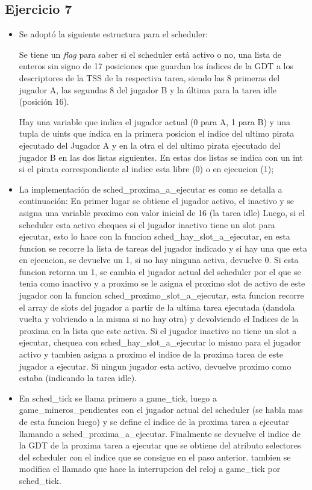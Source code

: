 \subsection{Ejercicio 7}

\begin{itemize}

\item Se adoptó la siguiente estructura para el scheduler:

Se tiene un {\it flag\/} para saber si el scheduler está activo o no, una lista
de enteros sin signo de 17 posiciones que guardan los índices de la GDT  a los
descriptores de la TSS de la respectiva tarea, siendo las 8 primeras del jugador
A, las segundas 8 del jugador B y la última para la tarea idle (posición 16).

Hay una variable que indica el jugador actual (0 para A, 1 para B) y una tupla
de uints que indica en la primera posicion el indice del ultimo pirata ejecutado
del Jugador A y en la otra el del  ultimo pirata ejecutado del jugador B en las
dos listas siguientes.
En estas dos listas se indica con un int si el pirata correspondiente al indice esta libre (0) o en ejecucion (1);

\item La implementación de sched_proxima_a_ejecutar es como se detalla a
continuación:
  En primer lugar se obtiene el jugador activo, el inactivo y se asigna una variable proximo con valor inicial de 16 (la tarea idle)
  Luego, si el scheduler esta activo chequea si el jugador inactivo tiene un slot para ejecutar, esto lo hace con la
  funcion sched_hay_slot_a_ejecutar, en esta funcion se recorre la lista de tareas del jugador indicado y si hay una que esta
  en ejecucion, se devuelve un 1, si no hay ninguna activa, devuelve 0.
  Si esta funcion retorna un 1, se cambia el jugador actual del scheduler por el que se tenia como inactivo y a proximo se le asigna
  el proximo slot de activo de este jugador con la funcion sched_proximo_slot_a_ejecutar, esta funcion recorre el array de slots
  del jugador a partir de la ultima tarea ejecutada (dandola vuelta y volviendo a la misma si no hay otra) y devolviendo el Indices
  de la proxima en la lista que este activa.
  Si el jugador inactivo no tiene un slot a ejecutar, chequea con sched_hay_slot_a_ejecutar lo mismo para el jugador activo y
  tambien asigna a proximo el indice de la proxima tarea de este jugador a ejecutar.
  Si ningun jugador esta activo, devuelve proximo como estaba (indicando la tarea idle).

\item En sched_tick se llama primero a game_tick, luego a game_mineros_pendientes con el jugador actual del scheduler (se habla mas
  de esta funcion luego) y se define el indice de la proxima tarea a ejecutar llamando a sched_proxima_a_ejecutar.
  Finalmente se devuelve el indice de la GDT de la proxima tarea a ejecutar que se obtiene del atributo selectores del scheduler
  con el indice que se consigue en el paso anterior. tambien se modifica el llamado que hace la interrupcion del reloj a game_tick
  por sched_tick.


\end{itemize}
